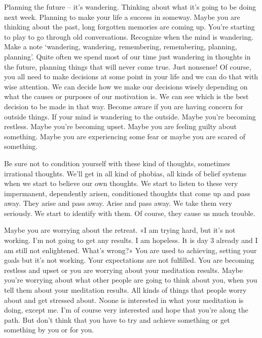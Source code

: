 \documentclass[letterpaper,10pt,english]{sphinxmanual}
\begin{document}
\sphinxAtStartPar
Planning  the  future  –  it’s  wandering.  Thinking  about  what  it’s  going
to be doing next week. Planning to make your life a success in someway.
Maybe you are thinking about the past, long forgotten memories are coming
up. You’re starting to play to go through old conversations. Recognize when
the mind is wandering. Make a note ‘wandering, wandering, remembering,
remembering, planning, planning’. Quite often we spend most of our time
just wandering in thoughts in the future, planning things that will never come
true. Just nonsense! Of course, you all need to make decisions at some point
in your life and we can do that with wise attention. We can decide how we
make our decisions wisely depending on what the causes or purposes of our
motivation is. We can see which is the best decision to be made in that way.
Become  aware  if  you  are  having  concern  for  outside  things.  If  your
mind is wandering to the outside. Maybe you’re becoming restless. Maybe
you’re  becoming  upset.  Maybe  you  are  feeling  guilty  about  something.
Maybe you are experiencing some fear or maybe you are scared of something.

\sphinxAtStartPar
Be sure not to condition yourself with these kind of thoughts, sometimes irrational thoughts. We’ll get in all kind of phobias, all kinds of belief
systems when we start to believe our own thoughts. We start to listen to these
very impermanent, dependently arisen, conditioned thoughts that come up
and pass away. They arise and pass away. Arise and pass away. We take them
very seriously. We start to identify with them. Of course, they cause us much
trouble.

\sphinxAtStartPar
Maybe you are worrying about the retreat. «I am trying hard, but it’s
not  working.  I’m  not  going  to  get  any  results.  I  am  hopeless.  It  is  day  3
already  and  I  am  still  not  enlightened.  What’s  wrong?»  You  are  used  to
achieving, setting your goals but it’s not working. Your expectations are not
  fulfilled.  You  are  becoming  restless  and  upset  or  you  are  worrying  about
your meditation results. Maybe you’re worrying about what other people are
going to think about you, when you tell them about your meditation results.
All kinds of things that people worry about and get stressed about. No\sphinxhyphen{}one
is interested in what your meditation is doing, except me. I’m of course very
interested and hope that you’re along the path. But don’t think that you have
to try and achieve something or get something by you or for you.
\end{document}
